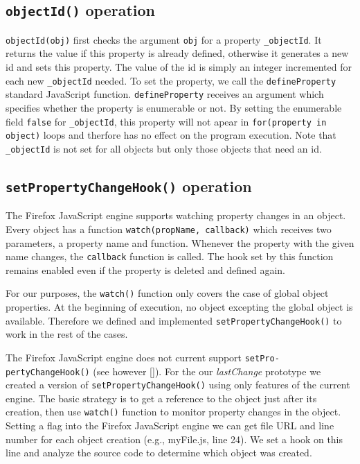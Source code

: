 \documentclass[preprint]{sigplanconf}
\begin{document}
\subsection{\texttt{objectId()} operation}
\texttt{objectId(obj)} first checks the argument \texttt{obj} for a property \texttt{\_objectId}.
It returns the value if this property is already defined,
otherwise it generates a new id and sets this property. The value of the id is simply an integer incremented 
for each new \texttt{\_objectId} needed. To set %
the property, we call the \texttt{defineProperty} standard JavaScript
function. \texttt{defineProperty} receives an argument which specifies
whether the property is enumerable or not. By setting the enumerable
field \texttt{false} for \texttt{\_objectId}, this property will not
apear in \texttt{for(property in object)} loops and therfore has no
effect on the program execution. Note that \texttt{\_objectId} is
not set for all objects but only those objects that need an id.

\subsection{\texttt{setPropertyChangeHook()} operation}
The Firefox JavaScript engine supports watching property changes in an
object. Every object has a function \texttt{watch(propName, callback)}
which receives two parameters, a property name and function.  Whenever
the property with the given name changes, the \texttt{callback} function is
called. The hook set by this function remains enabled even if the
property is deleted and defined again. 

For our purposes, the \texttt{watch()} function only covers the case
of global object properties. At the beginning of execution, no object
excepting the global object is available. Therefore we defined and
implemented \texttt{setPropertyChangeHook()} to work in the rest of
the cases. 

The Firefox JavaScript engine does not current support
\texttt{setPro-}
\texttt{pertyChangeHook()} (see however []).  For %
the our \textit{lastChange} prototype we created a version of
\texttt{setPropertyChangeHook()} using only features of the current
engine.  The basic strategy is to get a reference to the object just
after its creation, then use \texttt{watch()} function to monitor
property changes in the object.  Setting a flag into the Firefox
JavaScript engine we can get file URL and line number for each object
creation (e.g., myFile.js, line 24). We set a hook on this line
and analyze the source code to determine which object was created.
\end{document}

